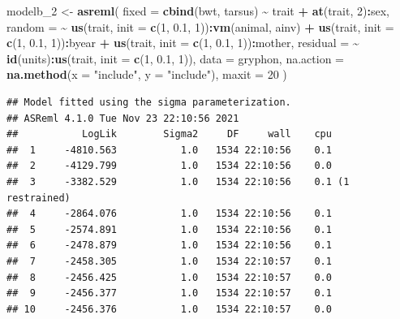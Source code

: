 \documentclass[
  12pt,
]{book}
\newenvironment{Shaded}{\begin{snugshade}}{\end{snugshade}}
\newcommand{\DataTypeTok}[1]{\textcolor[rgb]{0.13,0.29,0.53}{#1}}
\newcommand{\DecValTok}[1]{\textcolor[rgb]{0.00,0.00,0.81}{#1}}
\newcommand{\FloatTok}[1]{\textcolor[rgb]{0.00,0.00,0.81}{#1}}
\newcommand{\KeywordTok}[1]{\textcolor[rgb]{0.13,0.29,0.53}{\textbf{#1}}}
\newcommand{\NormalTok}[1]{#1}
\newcommand{\OperatorTok}[1]{\textcolor[rgb]{0.81,0.36,0.00}{\textbf{#1}}}
\newcommand{\StringTok}[1]{\textcolor[rgb]{0.31,0.60,0.02}{#1}}
\begin{document}
\begin{Shaded}
\begin{Highlighting}[]
\NormalTok{modelb\_}\DecValTok{2}\NormalTok{ \textless{}{-}}\StringTok{ }\KeywordTok{asreml}\NormalTok{(}
  \DataTypeTok{fixed =} \KeywordTok{cbind}\NormalTok{(bwt, tarsus) }\OperatorTok{\textasciitilde{}}\StringTok{ }\NormalTok{trait }\OperatorTok{+}\StringTok{ }\KeywordTok{at}\NormalTok{(trait, }\DecValTok{2}\NormalTok{)}\OperatorTok{:}\NormalTok{sex,}
  \DataTypeTok{random =} \OperatorTok{\textasciitilde{}}\StringTok{ }\KeywordTok{us}\NormalTok{(trait, }\DataTypeTok{init =} \KeywordTok{c}\NormalTok{(}\DecValTok{1}\NormalTok{, }\FloatTok{0.1}\NormalTok{, }\DecValTok{1}\NormalTok{))}\OperatorTok{:}\KeywordTok{vm}\NormalTok{(animal, ainv) }\OperatorTok{+}
\StringTok{    }\KeywordTok{us}\NormalTok{(trait, }\DataTypeTok{init =} \KeywordTok{c}\NormalTok{(}\DecValTok{1}\NormalTok{, }\FloatTok{0.1}\NormalTok{, }\DecValTok{1}\NormalTok{))}\OperatorTok{:}\NormalTok{byear }\OperatorTok{+}
\StringTok{    }\KeywordTok{us}\NormalTok{(trait, }\DataTypeTok{init =} \KeywordTok{c}\NormalTok{(}\DecValTok{1}\NormalTok{, }\FloatTok{0.1}\NormalTok{, }\DecValTok{1}\NormalTok{))}\OperatorTok{:}\NormalTok{mother,}
  \DataTypeTok{residual =} \OperatorTok{\textasciitilde{}}\StringTok{ }\KeywordTok{id}\NormalTok{(units)}\OperatorTok{:}\KeywordTok{us}\NormalTok{(trait, }\DataTypeTok{init =} \KeywordTok{c}\NormalTok{(}\DecValTok{1}\NormalTok{, }\FloatTok{0.1}\NormalTok{, }\DecValTok{1}\NormalTok{)),}
  \DataTypeTok{data =}\NormalTok{ gryphon,}
  \DataTypeTok{na.action =} \KeywordTok{na.method}\NormalTok{(}\DataTypeTok{x =} \StringTok{"include"}\NormalTok{, }\DataTypeTok{y =} \StringTok{"include"}\NormalTok{),}
  \DataTypeTok{maxit =} \DecValTok{20}
\NormalTok{)}
\end{Highlighting}
\end{Shaded}

\begin{verbatim}
## Model fitted using the sigma parameterization.
## ASReml 4.1.0 Tue Nov 23 22:10:56 2021
##           LogLik        Sigma2     DF     wall    cpu
##  1     -4810.563           1.0   1534 22:10:56    0.1
##  2     -4129.799           1.0   1534 22:10:56    0.0
##  3     -3382.529           1.0   1534 22:10:56    0.1 (1 restrained)
##  4     -2864.076           1.0   1534 22:10:56    0.1
##  5     -2574.891           1.0   1534 22:10:56    0.1
##  6     -2478.879           1.0   1534 22:10:56    0.1
##  7     -2458.305           1.0   1534 22:10:57    0.1
##  8     -2456.425           1.0   1534 22:10:57    0.0
##  9     -2456.377           1.0   1534 22:10:57    0.1
## 10     -2456.376           1.0   1534 22:10:57    0.0
\end{verbatim}
\end{document}
